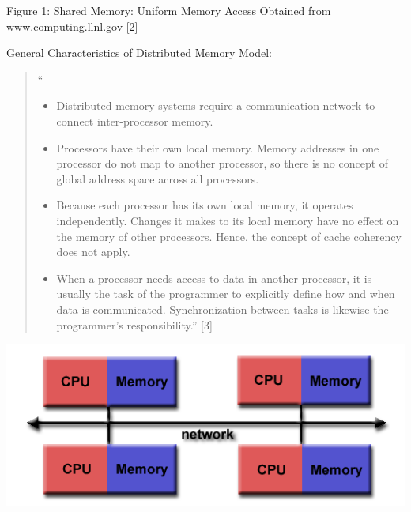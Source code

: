 \documentclass[letterpaper,10pt,openany,oneside]{sphinxmanual}
\begin{document}
\begin{center}Figure 1: Shared Memory: Uniform Memory Access Obtained from www.computing.llnl.gov {[}2{]}
\end{center}
General Characteristics of Distributed Memory Model:
\begin{quote}

``
\begin{itemize}
\item {} 
Distributed memory systems require a communication network to connect inter-processor memory.

\item {} 
Processors have their own local memory. Memory addresses in one processor do not map to another processor, so there is no concept of global address space across all processors.

\item {} 
Because each processor has its own local memory, it operates independently. Changes it makes to its local memory have no effect on the memory of other processors. Hence, the concept of cache coherency does not apply.

\item {} 
When a processor needs access to data in another processor, it is usually the task of the programmer to explicitly define how and when data is communicated. Synchronization between tasks is likewise the programmer's responsibility.'' {[}3{]}

\end{itemize}
\end{quote}

{\hfill\includegraphics{DistributedMemory.png}\hfill}
\end{document}

